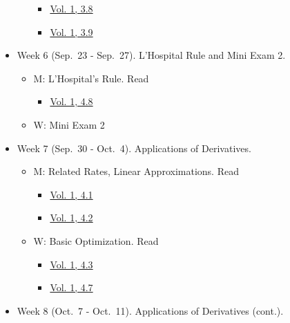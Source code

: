 \documentclass[
]{article}
\providecommand{\tightlist}{%
  \setlength{\itemsep}{0pt}\setlength{\parskip}{0pt}}
\begin{document}
\begin{itemize}
\begin{itemize}
    \begin{itemize}
    \tightlist
    \item
      \href{https://openstax.org/books/calculus-volume-1/pages/3-8-implicit-differentiation}{Vol. 1, 3.8}
    \item
      \href{https://openstax.org/books/calculus-volume-1/pages/3-9-derivatives-of-exponential-and-logarithmic-functions}{Vol. 1, 3.9}
    \end{itemize}
  \end{itemize}
\item
  Week 6 (Sep.~23 - Sep.~27). L'Hospital Rule and Mini Exam 2.

  \begin{itemize}
  \tightlist
  \item
    M: L'Hospital's Rule. Read

    \begin{itemize}
    \tightlist
    \item
      \href{https://openstax.org/books/calculus-volume-1/pages/4-8-lhopitals-rule}{Vol. 1, 4.8}
    \end{itemize}
  \item
    W: Mini Exam 2
  \end{itemize}
\item
  Week 7 (Sep.~30 - Oct.~4). Applications of Derivatives.

  \begin{itemize}
  \tightlist
  \item
    M: Related Rates, Linear Approximations. Read

    \begin{itemize}
    \tightlist
    \item
      \href{https://openstax.org/books/calculus-volume-1/pages/4-1-related-rates}{Vol. 1, 4.1}
    \item
      \href{https://openstax.org/books/calculus-volume-1/pages/4-2-linear-approximations-and-differentials}{Vol. 1, 4.2}
    \end{itemize}
  \item
    W: Basic Optimization. Read

    \begin{itemize}
    \tightlist
    \item
      \href{https://openstax.org/books/calculus-volume-1/pages/4-3-maxima-and-minima}{Vol. 1, 4.3}
    \item
      \href{https://openstax.org/books/calculus-volume-1/pages/4-7-applied-optimization-problems}{Vol. 1, 4.7}
    \end{itemize}
  \end{itemize}
\item
  Week 8 (Oct.~7 - Oct.~11). Applications of Derivatives (cont.).


\end{itemize}
\end{document}
